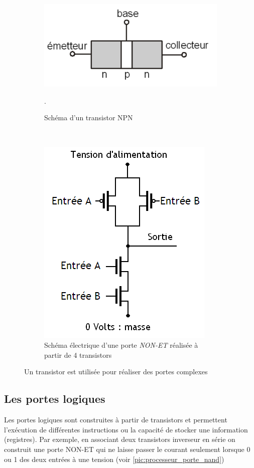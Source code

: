 \begin{figure}[htbp]
    \centering
    \begin{subfigure}[b]{0.45\linewidth}\centering
        \includegraphics[width=\linewidth]{images/transistor.png}
        \caption{\label{pic:transistor} Schéma d'un transistor NPN \cite{GeraldHuguenin2018}}.
    \end{subfigure}
    ~ %
    \begin{subfigure}[b]{0.45\linewidth}\centering
        \includegraphics[width=0.5\linewidth]{images/processeur_porte_nand.png}
        \caption{\label{pic:processeur_porte_nand} Schéma électrique d'une porte \textit{NON-ET} réalisée à partir de 4 transistors \cite{Wikibooks2019PorteNand}}
    \end{subfigure}
    \caption{Un transistor est utilisée pour réaliser des portes complexes  }\label{pic:transistor_usage}
\end{figure}




\subsection{Les portes logiques}
Les portes logiques sont construites à partir de transistors et permettent l'exécution de différentes instructions ou la capacité de stocker une information (registres). Par exemple, en associant deux transistors inverseur en série on construit une porte NON-ET qui ne laisse passer le courant seulement lorsque 0 ou 1 des deux entrées à une tension (voir \autoref{pic:processeur_porte_nand})



